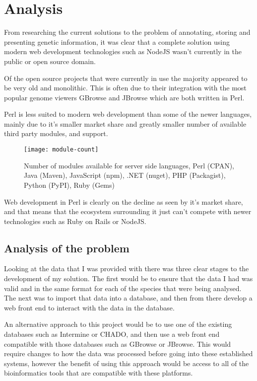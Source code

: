\section{Analysis}

From researching the current solutions to the problem of annotating, storing and presenting genetic information, it was clear that a complete solution using modern web development technologies such as NodeJS wasn't currently in the public or open source domain. 

Of the open source projects that were currently in use the majority appeared to be very old and monolithic. This is often due to their integration with the most popular genome viewers GBrowse\cite{gbrowse} and JBrowse\cite{jbrowse} which are both written in Perl.

Perl is less suited to modern web development than some of the newer languages, mainly due to it's smaller market share\cite{perl-market} and greatly smaller number of available third party modules, and support.

\begin{figure}[ht!]
\begin{center}
\texttt{[image: module-count]}
\caption{Number of modules available for server side languages, Perl (CPAN), Java (Maven), JavaScript (npm), .NET (nuget), PHP (Packagist), Python (PyPI), Ruby (Gems)\cite{modulecounts}}
\end{center}
\end{figure}

Web development in Perl is clearly on the decline as seen by it's market share\cite{perl-market}, and that means that the ecosystem surrounding it just can't compete with newer technologies such as Ruby on Rails or NodeJS.

\subsection{Analysis of the problem}
Looking at the data that I was provided with there was three clear stages to the development of my solution. The first would be to ensure that the data I had was valid and in the same format for each of the species that were being analysed. The next was to import that data into a database, and then from there develop a web front end to interact with the data in the database. 

An alternative approach to this project would be to use one of the existing databases such as Intermine\cite{intermine} or CHADO\cite{chado}, and then use a web front end compatible with those databases such as GBrowse\cite{gbrowse} or JBrowse\cite{jbrowse}. This would require changes to how the data was processed before going into these established systems, however the benefit of using this approach would be access to all of the bioinformatics tools that are compatible with these platforms.

